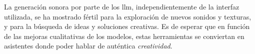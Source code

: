 La generación sonora por parte de los \gls{llm}, independientemente de la interfaz utilizada, se ha mostrado fértil para la exploración de nuevos sonidos y texturas, y para la búsqueda de ideas y soluciones creativas. Es de esperar que en función de las mejoras cualitativas de los modelos, estas herramientas se conviertan en asistentes donde poder hablar de auténtica \emph{creatividad}. 


















